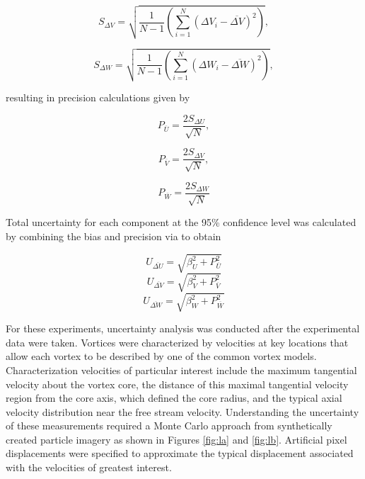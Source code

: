 \begin{equation}
S_{\Delta V} = \sqrt{\frac{1}{N-1} \left(\sum_{i=1}^N (\Delta V_i - 
	\overline{\Delta V})^2 \right)},
\label{eq:Vsd}
\end{equation}

\begin{equation}
S_{\Delta W} = \sqrt{\frac{1}{N-1} \left(\sum_{i=1}^N (\Delta W_i - 
	\overline{\Delta W})^2 \right)},
\label{eq:Wsd}
\end{equation}

\noindent
resulting in precision calculations given by 
	
\begin{equation}
P_{\overline{U}} = \frac{2 S_{\Delta U}}{\sqrt{N}},
\label{eq:Uprec}
\end{equation}

\begin{equation}
P_{\overline{V}} = \frac{2 S_{\Delta V}}{\sqrt{N}},
\label{eq:Vprec}
\end{equation}

\begin{equation}
P_{\overline{W}} = \frac{2 S_{\Delta W}}{\sqrt{N}}
\label{eq:Wprec}
\end{equation}

Total uncertainty for each component at the 95\% confidence level was 
calculated by combining the bias and precision via to obtain

\begin{equation}
U_{\overline{\Delta U}} = \sqrt{\beta_{U}^2 + P_{\overline{U}}^2}
\label{eq:Uuncert}
\end{equation}
\begin{equation}
U_{\overline{\Delta V}} = \sqrt{\beta_{V}^2 + P_{\overline{V}}^2}
\label{eq:Vuncert}
\end{equation}
\begin{equation}
U_{\overline{\Delta W}} = \sqrt{\beta_{W}^2 + P_{\overline{W}}^2}
\label{eq:Wuncert}
\end{equation}


For these experiments, uncertainty analysis was conducted after the 
experimental data were taken. Vortices were characterized by velocities at key 
locations that allow each vortex to be described by one of the common vortex 
models. Characterization velocities of particular interest include the maximum 
tangential velocity about the vortex core, the distance of this maximal 
tangential velocity region from the core axis, which defined the core radius, 
and the typical 
axial velocity distribution near the free stream velocity. Understanding the 
uncertainty of these measurements required a Monte Carlo approach from 
synthetically created particle imagery as shown in Figures \ref{fig:la} and 
\ref{fig:lb}. Artificial pixel displacements were specified to approximate the 
typical displacement associated with the velocities of greatest interest. 

